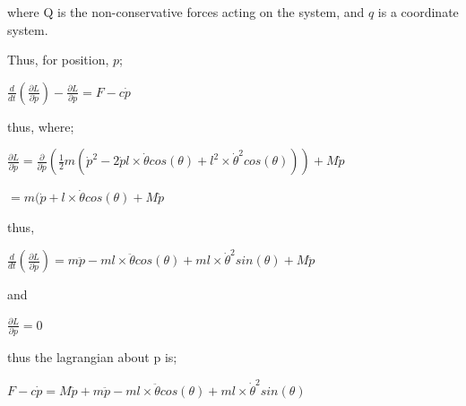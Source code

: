 \documentclass[12pt]{article}
\begin{document}
where Q is the non-conservative forces acting on the system, and $q$ is a coordinate system.


\vspace{\baselineskip}


Thus, for position, $p$;


\vspace{\baselineskip}


$\frac{d}{dt} (\frac{\partial L}{\partial \dot{p}}) - \frac{\partial L}{\partial p} = F - c \dot{p}$


\vspace{\baselineskip}


thus, where;


\vspace{\baselineskip}


$\frac{\partial L}{\partial \dot{p}} =  \frac{\partial}{\partial \dot{p}} (\frac{1}{2} m (\dot{p}^2 - 2 \dot{p} l \times \dot{\theta} cos(\theta) + l^2 \times \dot{\theta}^2 cos(\theta))) + M\dot{p}$


\vspace{\baselineskip}


$ = m(\dot{p} + l \times \dot{\theta} cos(\theta) + M \dot{p}$


\vspace{\baselineskip}
 
thus,


\vspace{\baselineskip}


$\frac{d}{dt} (\frac{\partial L}{\partial \dot{p}}) = m \ddot{p} - m l \times \ddot{\theta} cos(\theta) + m l \times \dot{\theta}^2 sin(\theta) + M \ddot{p} $


\vspace{\baselineskip}

and 

\vspace{\baselineskip}


$\frac{\partial L}{\partial p} = 0$


\vspace{\baselineskip}


thus the lagrangian about p is;


\vspace{\baselineskip}


$F - c \dot{p} = M \ddot{p} + m \ddot{p} - m l \times \ddot{\theta} cos(\theta) + m l \times \dot{\theta}^2 sin(\theta)$


\vspace{\baselineskip}
 
\end{document}
